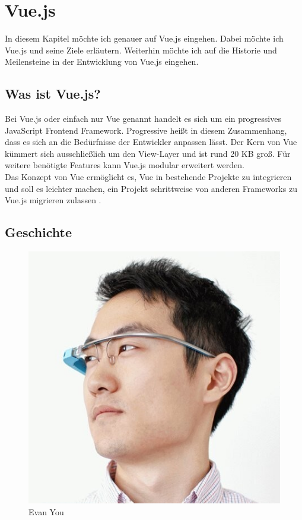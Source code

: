 %
\chapter{Vue.js}
In diesem Kapitel möchte ich genauer auf Vue.js eingehen.
Dabei möchte ich Vue.js und seine Ziele erläutern.
Weiterhin möchte ich auf die Historie und Meilensteine in der Entwicklung von Vue.js eingehen.


\section{Was ist Vue.js?}
Bei Vue.js oder einfach nur Vue genannt handelt es sich um ein progressives JavaScript Frontend Framework.
Progressive heißt in diesem Zusammenhang,
dass es sich an die Bedürfnisse der Entwickler anpassen lässt.
Der Kern von Vue kümmert sich ausschließlich um den View-Layer und ist rund 20 KB groß.
Für weitere benötigte Features kann Vue.js modular erweitert werden. \cite[S. 523-524]{bin2019}
\\
Das Konzept von Vue ermöglicht es, Vue in bestehende Projekte zu integrieren
und soll es leichter machen, ein Projekt
schrittweise von anderen Frameworks zu Vue.js migrieren zulassen \cite[S. 1]{peterke2019}.

\newpage

\section{Geschichte}

\begin{figure}[!htb]
    \centering
    \includegraphics[width=.2\textwidth]{img/you}
    \caption{Evan You \cite{linkedinYou}}
    \label{fig:you}
\end{figure}

